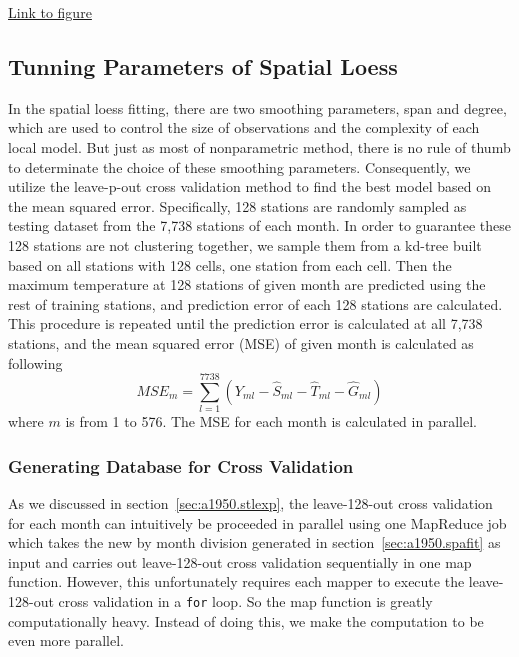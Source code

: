 \begin{framed}
\begin{center}
  \href{../plots/a1950/spafit/d2/span0.015/a1950.spaResid.vs.elev.lon.pdf}
  {Link to figure}
  \label{spafit.elev.lon}
\end{center}
\end{framed}


\subsection{Tunning Parameters of Spatial Loess}

In the spatial loess fitting, there are two smoothing parameters, span and degree,
which are used to control the size of observations and the complexity of each 
local model. But just as most of nonparametric method, there is no rule of thumb
to determinate the choice of these smoothing parameters. Consequently, we utilize 
the leave-p-out cross validation method to find the best model based on the mean 
squared error. Specifically, 128 stations are randomly sampled as testing dataset
from the 7,738 stations of each month. In order to guarantee these 128 stations
are not clustering together, we sample them from a kd-tree built based on all
stations with 128 cells, one station from each cell. Then the maximum temperature
at 128 stations of given month are predicted using the rest of training stations,
and prediction error of each 128 stations are calculated. This procedure is 
repeated until the prediction error is calculated at all 7,738 stations, and the
mean squared error (MSE) of given month is calculated as following
$$
MSE_m = \sum_{l=1}^{7738} \left( Y_{ml} - \hat S_{ml} - \hat T_{ml} - \hat G_{ml}
\right) 
$$
where $m$ is from 1 to 576. The MSE for each month is calculated in parallel.

\subsubsection{Generating Database for Cross Validation}

As we discussed in section~\ref{sec:a1950.stlexp}, the leave-128-out cross 
validation for each month can intuitively be proceeded in parallel using one 
MapReduce job which takes the new by month division generated in 
section~\ref{sec:a1950.spafit} as input and carries out leave-128-out cross 
validation sequentially in one map function. However, this unfortunately requires
each mapper to execute the leave-128-out cross validation in a \texttt{for} loop. 
So the map function is greatly computationally heavy. Instead of doing this, we
make the computation to be even more parallel. 

